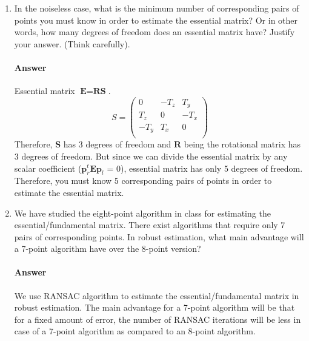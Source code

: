 \documentclass[11pt]{article}
\begin{document}
\begin{enumerate}
\begin{enumerate}
\item In the noiseless case, what is the minimum number of corresponding pairs of points you must know in order to estimate the essential matrix? Or in other words, how many degrees of freedom does an essential matrix have? Justify your answer. (Think carefully).
\paragraph{Answer}
Essential matrix $\textbf{E} = \textbf{RS}$.\\
\[
S =
\begin{pmatrix}
    0 & -T_{z} & T_{y} \\
    T_{z} & 0 & - T_{x} \\
    - T_{y} & T_{x} & 0\\
\end{pmatrix}
\]
Therefore, $\textbf{S}$ has 3 degrees of freedom and $\textbf{R}$ being the rotational matrix has 3 degrees of freedom. But since we can divide the essential matrix by any scalar coefficient ($\textbf{p}_r^t\textbf{Ep}_l$ = 0), essential matrix has only 5 degrees of freedom. Therefore, you must know 5 corresponding pairs of points in order to estimate the essential matrix.

\item We have studied the eight-point algorithm in class for estimating the essential/fundamental matrix. There exist algorithms that require only 7 pairs of corresponding points. In robust estimation, what main advantage will a 7-point algorithm have over the 8-point version?
\paragraph{Answer}
We use RANSAC algorithm to estimate the essential/fundamental matrix in robust estimation. The main advantage for a 7-point algorithm will be that for a fixed amount of error, the number of RANSAC iterations will be less in case of a 7-point algorithm as compared to an 8-point algorithm.
\end{enumerate}
\end{enumerate}
\end{document}
